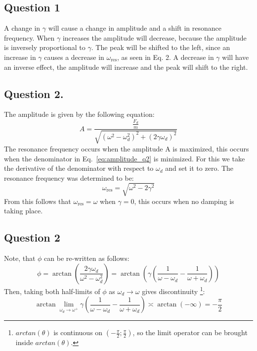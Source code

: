 \subsection{Question 1}

A change in $\gamma$ will cause a change in amplitude and a shift in resonance frequency. When $\gamma$ increases the amplitude will decrease, because the amplitude is inversely proportional to $\gamma$. The peak will be shifted to the left, since an increase in $\gamma$ causes a decrease in $\omega_{\text{res}}$, as seen in Eq. 2. A decrease in $\gamma$ will have an inverse effect, the amplitude will increase and the peak will shift to the right.

\subsection{Question 2.}
The amplitude is given by the following equation:
\begin{equation} \label{eq:amplitude_q2}
        A = \frac{\frac{F_d}{m}}{\sqrt{(\omega^2 - \omega_d^2)^2 + (2\gamma\omega_d)^2}}
\end{equation}
The resonance frequency occurs when the amplitude A is maximized, this occurs when the denominator in Eq.~\eqref{eq:amplitude_q2} is minimized. For this we take the derivative of the denominator with respect to $\omega_d$ and set it to zero. The resonance frequency was determined to be: 
\begin{equation} \label{eq:freq_deps}
        \omega_{\text{res}} = \sqrt{\omega^2 - 2\gamma^2}
\end{equation}
From this follows that $\omega_{\text{res}} = \omega$ when $\gamma = 0$, this occurs when no damping is taking place.

\subsection{Question 2}
Note, that $\phi$ can be re-written as follows:
\begin{equation*}
        \phi = \arctan(\frac{2\gamma\omega_d}{\omega^2 - \omega_d^2}) = \arctan(\gamma ( \frac{1}{\omega-\omega_d} - \frac{1}{\omega+\omega_d} ))
\end{equation*}
Then, taking both half-limits of $\phi$ as $\omega_d \rightarrow \omega$ gives discontinuity \footnote{$arctan(\theta)$ is continuous on $(-\frac{\pi}{2};\frac{\pi}{2})$, so the limit operator can be brought inside $arctan(\theta)$.}:
\begin{equation*}
        \arctan \lim_{\omega_d \rightarrow \omega^+} {\gamma ( \frac{1}{\omega-\omega_d} - \frac{1}{\omega+\omega_d} )} \asymp \arctan( -\infty) = -\frac{\pi}{2}
\end{equation*}

